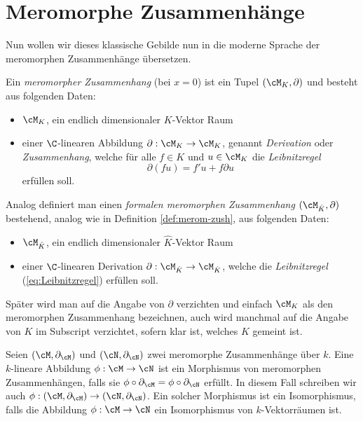 \section{Meromorphe Zusammenhänge}
Nun wollen wir dieses klassische Gebilde nun in die moderne Sprache der
meromorphen Zusammenhänge übersetzen.
\begin{defn} \label{def:merom-zush}
Ein \emph{meromorpher Zusammenhang} (bei $x=0$) ist ein Tupel
$(\cM_K,\partial)$ und besteht aus folgenden Daten:
\begin{itemize}
\item $\cM_K$, ein endlich dimensionaler $K$-Vektor Raum
\item einer $\C$-linearen Abbildung $\partial:\cM_K\rightarrow \cM_K$,
genannt \emph{Derivation} oder \emph{Zusammenhang}, welche für alle $f\in K$
und $u\in \cM_K$ die \emph{Leibnitzregel}
\begin{equation}\label{eq:Leibnitzregel}
\partial(fu)=f'u+f\partial u %
\end{equation}
erfüllen soll.
\end{itemize}
\end{defn}
\begin{bem} %
Analog definiert man einen \emph{formalen meromorphen Zusammenhang}
$(\cM_{\hat K},\partial)$ bestehend, analog wie in Definition
\ref{def:merom-zush}, aus folgenden Daten:
\begin{itemize}
\item $\cM_{\hat K}$, ein endlich dimensionaler $\hat K$-Vektor Raum
\item einer $\C$-linearen Derivation $\partial:\cM_{\hat K}\rightarrow
\cM_{\hat K}$, welche die \emph{Leibnitzregel} (\ref{eq:Leibnitzregel})
erfüllen soll.
\end{itemize}
\end{bem}

\begin{bem}
Später wird man auf die Angabe von $\partial$ verzichten und einfach $\cM_K$
als den meromorphen Zusammenhang bezeichnen, auch wird manchmal auf die Angabe
von $K$ im Subscript verzichtet, sofern klar ist, welches $K$ gemeint ist.
\end{bem}

\begin{defn}
Seien $(\cM,\partial_\cM)$ und $(\cN,\partial_\cN)$ zwei meromorphe
Zusammenhänge über $k$. Eine $k$-lineare Abbildung $\phi:\cM\rightarrow\cN$
ist ein Morphismus von meromorphen Zusammenhängen, falls sie
$\phi\circ\partial_\cM=\phi\circ\partial_\cN$ erfüllt. In diesem Fall
schreiben wir auch $\phi:(\cM,\partial_\cM)\rightarrow(\cN,\partial_\cN)$.
Ein solcher Morphismus ist ein Isomorphismus, falls die Abbildung
$\phi:\cM\rightarrow\cN$ ein Isomorphismus von $k$-Vektorräumen ist.
\end{defn}

